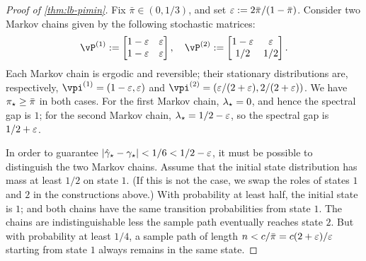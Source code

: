 \begin{proof}[Proof of \cref{thm:lb-pimin}]
  Fix $\bar\pi \in (0,1/3)$, and set $\varepsilon := 2\bar\pi/(1-\bar\pi)$.
  Consider two Markov chains given by the following stochastic
  matrices:
  \[
    \vP^{(1)} :=
    \begin{bmatrix}
      1-\veps & \veps \\
      1-\veps & \veps
    \end{bmatrix}
    , \quad
    \vP^{(2)} :=
    \begin{bmatrix}
      1-\veps & \veps \\
      1/2 & 1/2
    \end{bmatrix}
    .
  \]
  Each Markov chain is ergodic and reversible; their stationary
  distributions are, respectively, $\vpi^{(1)} = (1-\veps,\veps)$
  and $\vpi^{(2)} = (\veps/(2+\veps),2/(2+\veps))$.
  We have $\pi_{\star} \geq \bar\pi$ in both cases.
  For the first Markov chain, $\lambda_{\star} = 0$, and hence the spectral gap
  is $1$; for the second Markov chain, $\lambda_{\star} = 1/2-\varepsilon$, so the
  spectral gap is $1/2+\varepsilon$.

  In order to guarantee $|\hat\gamma_{\star} - \gamma_{\star}| < 1/6 < 1/2-\varepsilon$, it must
  be possible to distinguish the two Markov chains.
  Assume that the initial state distribution has mass at least $1/2$
  on state $1$.
  (If this is not the case, we swap the roles of states $1$ and $2$ in
  the constructions above.)
  With probability at least half, the initial state is $1$; and both
  chains have the same transition probabilities from state $1$.
  The chains are indistinguishable less the sample path eventually
  reaches state $2$.
  But with probability at least $1/4$, a sample path of length $n <
  c/\bar\pi = c(2+\varepsilon)/\varepsilon$ starting from state $1$ always
  remains in the same state.
\end{proof}



%

